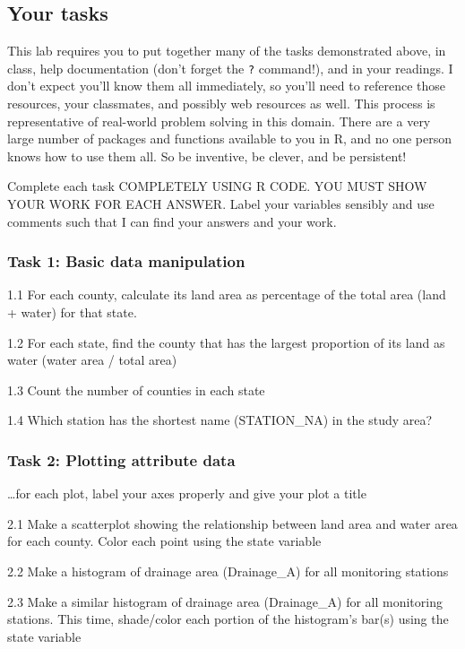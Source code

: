 \documentclass[]{article}
\begin{document}
\subsection{Your tasks}\label{your-tasks}

This lab requires you to put together many of the tasks demonstrated
above, in class, help documentation (don't forget the \texttt{?}
command!), and in your readings. I don't expect you'll know them all
immediately, so you'll need to reference those resources, your
classmates, and possibly web resources as well. This process is
representative of real-world problem solving in this domain. There are a
very large number of packages and functions available to you in R, and
no one person knows how to use them all. So be inventive, be clever, and
be persistent!

Complete each task COMPLETELY USING R CODE. YOU MUST SHOW YOUR WORK FOR
EACH ANSWER. Label your variables sensibly and use comments such that I
can find your answers and your work.

\subsubsection{Task 1: Basic data
manipulation}\label{task-1-basic-data-manipulation}

1.1 For each county, calculate its land area as percentage of the total
area (land + water) for that state.

1.2 For each state, find the county that has the largest proportion of
its land as water (water area / total area)

1.3 Count the number of counties in each state

1.4 Which station has the shortest name (STATION\_NA) in the study area?

\subsubsection{Task 2: Plotting attribute
data}\label{task-2-plotting-attribute-data}

\ldots for each plot, label your axes properly and give your plot a
title

2.1 Make a scatterplot showing the relationship between land area and
water area for each county. Color each point using the state variable

2.2 Make a histogram of drainage area (Drainage\_A) for all monitoring
stations

2.3 Make a similar histogram of drainage area (Drainage\_A) for all
monitoring stations. This time, shade/color each portion of the
histogram's bar(s) using the state variable
\end{document}
